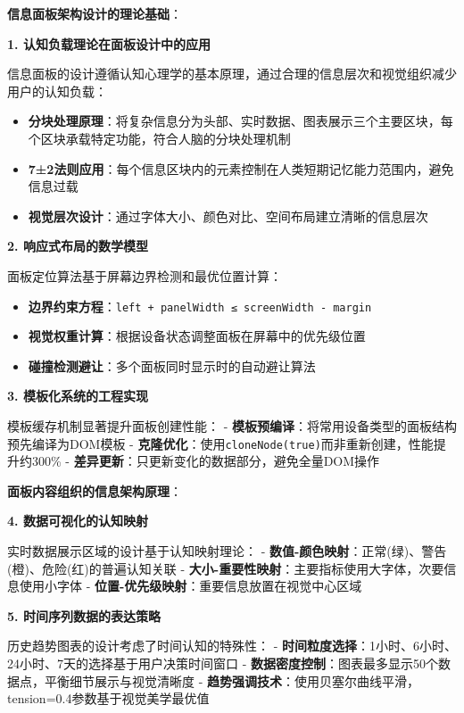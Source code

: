 \textbf{信息面板架构设计的理论基础}：

\textbf{1. 认知负载理论在面板设计中的应用}

信息面板的设计遵循认知心理学的基本原理，通过合理的信息层次和视觉组织减少用户的认知负载：

\begin{itemize}
\tightlist
\item
  \textbf{分块处理原理}：将复杂信息分为头部、实时数据、图表展示三个主要区块，每个区块承载特定功能，符合人脑的分块处理机制
\item
  \textbf{7±2法则应用}：每个信息区块内的元素控制在人类短期记忆能力范围内，避免信息过载
\item
  \textbf{视觉层次设计}：通过字体大小、颜色对比、空间布局建立清晰的信息层次
\end{itemize}

\textbf{2. 响应式布局的数学模型}

面板定位算法基于屏幕边界检测和最优位置计算：

\begin{itemize}
\tightlist
\item
  \textbf{边界约束方程}：\texttt{left\ +\ panelWidth\ ≤\ screenWidth\ -\ margin}
\item
  \textbf{视觉权重计算}：根据设备状态调整面板在屏幕中的优先级位置
\item
  \textbf{碰撞检测避让}：多个面板同时显示时的自动避让算法
\end{itemize}

\textbf{3. 模板化系统的工程实现}

模板缓存机制显著提升面板创建性能： - \textbf{模板预编译}：将常用设备类型的面板结构预先编译为DOM模板 - \textbf{克隆优化}：使用\texttt{cloneNode(true)}而非重新创建，性能提升约300\% - \textbf{差异更新}：只更新变化的数据部分，避免全量DOM操作

\textbf{面板内容组织的信息架构原理}：

\textbf{4. 数据可视化的认知映射}

实时数据展示区域的设计基于认知映射理论： - \textbf{数值-颜色映射}：正常(绿)、警告(橙)、危险(红)的普遍认知关联 - \textbf{大小-重要性映射}：主要指标使用大字体，次要信息使用小字体 - \textbf{位置-优先级映射}：重要信息放置在视觉中心区域

\textbf{5. 时间序列数据的表达策略}

历史趋势图表的设计考虑了时间认知的特殊性： - \textbf{时间粒度选择}：1小时、6小时、24小时、7天的选择基于用户决策时间窗口 - \textbf{数据密度控制}：图表最多显示50个数据点，平衡细节展示与视觉清晰度 - \textbf{趋势强调技术}：使用贝塞尔曲线平滑，tension=0.4参数基于视觉美学最优值

